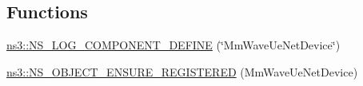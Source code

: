 \subsection*{Functions}
\begin{DoxyCompactItemize}
\item 
\hyperlink{namespacens3_a242f5882a39dc1bf0a3a82c12de519cb}{ns3\+::\+N\+S\+\_\+\+L\+O\+G\+\_\+\+C\+O\+M\+P\+O\+N\+E\+N\+T\+\_\+\+D\+E\+F\+I\+NE} (\char`\"{}Mm\+Wave\+Ue\+Net\+Device\char`\"{})
\item 
\hyperlink{namespacens3_adec518586cee8f02331fb659184f3ac9}{ns3\+::\+N\+S\+\_\+\+O\+B\+J\+E\+C\+T\+\_\+\+E\+N\+S\+U\+R\+E\+\_\+\+R\+E\+G\+I\+S\+T\+E\+R\+ED} (Mm\+Wave\+Ue\+Net\+Device)
\end{DoxyCompactItemize}
